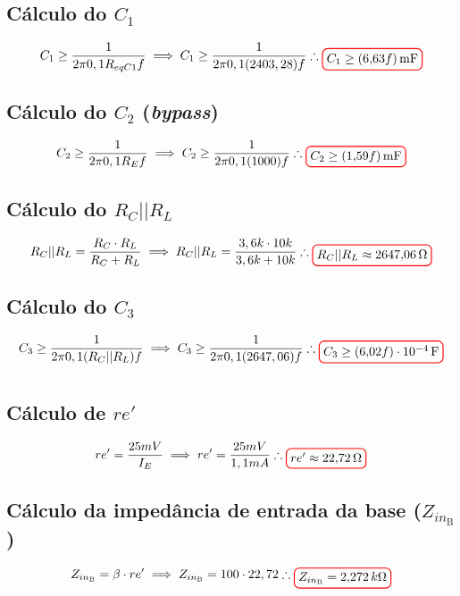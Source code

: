 \documentclass[12pt,openany,oneside,a4paper]{abntex2}
\begin{document}
\subsection{Cálculo do $C_{1}$}
\[
C_{1} \geq \frac{1}{2\pi0,1R_{eqC1}f} \implies C_{1} \geq \frac{1}{2\pi0,1(2403,28)f} \therefore \tikz[baseline]{\node[draw=red, thick, rounded corners] {$C_{1} \geq (6{,}63f)\,\text{mF}$};}
\]

\subsection{Cálculo do $C_{2}$ (\textit{bypass})}
\[
C_{2} \geq \frac{1}{2\pi0,1R_{E}f} \implies C_{2} \geq \frac{1}{2\pi0,1(1000)f} \therefore \tikz[baseline]{\node[draw=red, thick, rounded corners] {$C_{2} \geq (1{,}59f)\,\text{mF}$};}
\]

\subsection{Cálculo do $R_{C} || R_{L}$}
\[
R_{C} || R_{L} = \frac{R_{C} \cdot R_{L}}{R_{C} + R_{L}} \implies R_{C} || R_{L} = \frac{3,6k \cdot 10k}{3,6k + 10k} \therefore \tikz[baseline]{\node[draw=red, thick, rounded corners] {$R_{C} || R_{L} \approx 2647{,}06\,\Omega$};}
\]

\subsection{Cálculo do $C_{3}$}
\[
C_{3} \geq \frac{1}{2\pi0,1(R_{C} || R_{L})f} \implies C_{3} \geq \frac{1}{2\pi0,1(2647,06)f} \therefore \tikz[baseline]{\node[draw=red, thick, rounded corners] {$C_{3} \geq (6{,}02f)\cdot 10^{-4}\,\text{F}$};}
\]

\section{}

\subsection{Cálculo de $re'$}
\[
re' = \frac{25mV}{I_{E}} \implies re' = \frac{25mV}{1,1mA} \therefore \tikz[baseline]{\node[draw=red, thick, rounded corners] {$re' \approx 22{,}72\,\Omega$};}
\]

\subsection{Cálculo da impedância de entrada da base ($Z_{in_{\text{B}}}$)}
\[
Z_{in_{\text{B}}} = \beta \cdot re' \implies Z_{in_{\text{B}}} = 100 \cdot 22,72 \therefore \tikz[baseline]{\node[draw=red, thick, rounded corners] {$Z_{in_{\text{B}}} = 2{,}272\,k\Omega$};}
\]
\end{document}
